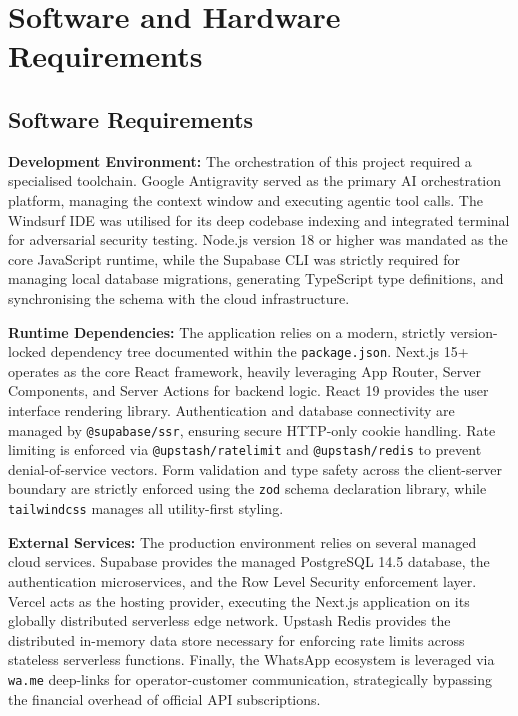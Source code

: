 \documentclass[12pt,a4paper]{report}
\begin{document}
\chapter{Software and Hardware Requirements}

\section{Software Requirements}

\textbf{Development Environment:}
The orchestration of this project required a specialised toolchain. Google Antigravity served as the primary AI orchestration platform, managing the context window and executing agentic tool calls. The Windsurf IDE was utilised for its deep codebase indexing and integrated terminal for adversarial security testing. Node.js version 18 or higher was mandated as the core JavaScript runtime, while the Supabase CLI was strictly required for managing local database migrations, generating TypeScript type definitions, and synchronising the schema with the cloud infrastructure.

\textbf{Runtime Dependencies:}
The application relies on a modern, strictly version-locked dependency tree documented within the \texttt{package.json}. Next.js 15+ operates as the core React framework, heavily leveraging App Router, Server Components, and Server Actions for backend logic. React 19 provides the user interface rendering library. Authentication and database connectivity are managed by \texttt{@supabase/ssr}, ensuring secure HTTP-only cookie handling. Rate limiting is enforced via \texttt{@upstash/ratelimit} and \texttt{@upstash/redis} to prevent denial-of-service vectors. Form validation and type safety across the client-server boundary are strictly enforced using the \texttt{zod} schema declaration library, while \texttt{tailwindcss} manages all utility-first styling.

\textbf{External Services:}
The production environment relies on several managed cloud services. Supabase provides the managed PostgreSQL 14.5 database, the authentication microservices, and the Row Level Security enforcement layer. Vercel acts as the hosting provider, executing the Next.js application on its globally distributed serverless edge network. Upstash Redis provides the distributed in-memory data store necessary for enforcing rate limits across stateless serverless functions. Finally, the WhatsApp ecosystem is leveraged via \texttt{wa.me} deep-links for operator-customer communication, strategically bypassing the financial overhead of official API subscriptions.
\end{document}
